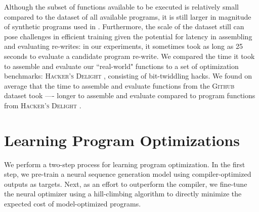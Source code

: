 \documentclass{article}
\newcommand{\GH}{\textsc{Github}}
\begin{document}
Although the subset of functions available to be executed is relatively small compared to the dataset of all available programs, it is still larger in magnitude of synthetic programs used in \cite{shi2020}. Furthermore, the scale of the dataset still can pose challenges in efficient training given the potential for latency in assembling and evaluating re-writes: in our experiments, it sometimes took as long as 25 seconds to evaluate a candidate program re-write. We compared the time it took to assemble and evaluate our ``real-world" functions to a set of optimization benchmarks: \textsc{Hacker's Delight} \cite{warren2013hacker}, consisting of bit-twiddling hacks. We found on average that the time to assemble and evaluate functions from the \GH{} dataset took ---- longer to assemble and evaluate compared to program functions from \textsc{Hacker's Delight} . 

\section{Learning Program Optimizations}


We perform a two-step process for learning program optimization.
In the first step, we pre-train a neural sequence generation model using compiler-optimized outputs as targets.
Next, as an effort to outperform the compiler, we fine-tune the neural optimizer using a hill-climbing algorithm to directly minimize the expected cost of model-optimized programs.
\end{document}
